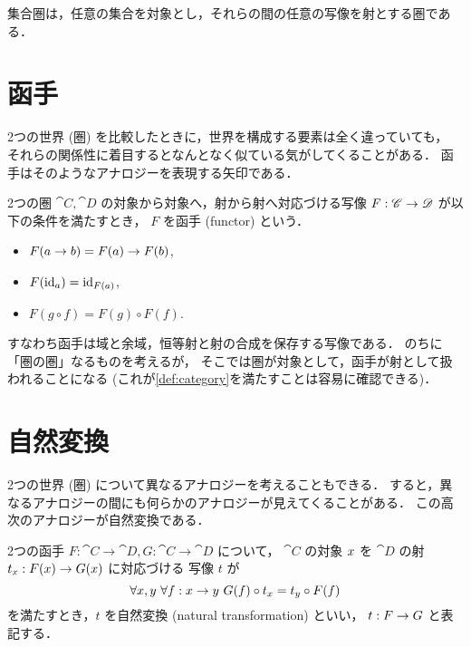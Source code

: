 \documentclass[titlepage]{ltjsreport}
\newtheorem[S]{theorem}{定理}[chapter]
\newtheorem[S]{definition}[theorem]{定義}
\newtheorem[S]{example}[theorem]{例}
\begin{document}
\begin{definition}[集合圏]
  集合圏は，任意の集合を対象とし，それらの間の任意の写像を射とする圏である．
\end{definition}

\section{函手}

2つの世界 (圏) を比較したときに，世界を構成する要素は全く違っていても，
それらの関係性に着目するとなんとなく似ている気がしてくることがある．
函手はそのようなアナロジーを表現する矢印である．
\begin{definition}[函手]
  \def\a{\obj{a}}%
  \def\b{\obj{b}}%
  2つの圏 $\cat{C},\cat{D}$ の対象から対象へ，射から射へ対応づける写像
  ${F}:{\mathscr{C}}\to{\mathscr{D}}$ が以下の条件を満たすとき，
  $F$ を函手 (functor) という．
  \begin{itemize}
    \item $F(\a\to\b)=F(\a)\to F(\b)$,
    \item $F(\id{\a})=\id{F(\a)}$,
    \item $F(g\circ f)=F(g)\circ F(f)$.
  \end{itemize}
\end{definition}
すなわち函手は域と余域，恒等射と射の合成を保存する写像である．
のちに「圏の圏」なるものを考えるが，
そこでは圏が対象として，函手が射として扱われることになる
(これが\cref{def:category}を満たすことは容易に確認できる)．

\section{自然変換}

2つの世界 (圏) について異なるアナロジーを考えることもできる．
すると，異なるアナロジーの間にも何らかのアナロジーが見えてくることがある．
この高次のアナロジーが自然変換である．

\begin{definition}[自然変換]
  \def\x{\obj{x}}%
  \def\y{\obj{y}}%
  2つの函手 $F:\cat{C}\to\cat{D},G:\cat{C}\to\cat{D}$ について，
  $\cat{C}$ の対象 $\x$ を $\cat{D}$ の射 $t_{\x}:F(\x)\to G(\x)$ に対応づける
  写像 $t$ が
  \begin{equation}
    \forall\x,\y\ \forall\mrp{f}{\x}{\y}\ G(f)\circ t_{\x}=t_{\y}\circ F(f)
  \end{equation}
  を満たすとき，$t$ を自然変換 (natural transformation) といい，
  ${t}:{F}\to{G}$ と表記する．
\end{definition}
\end{document}
